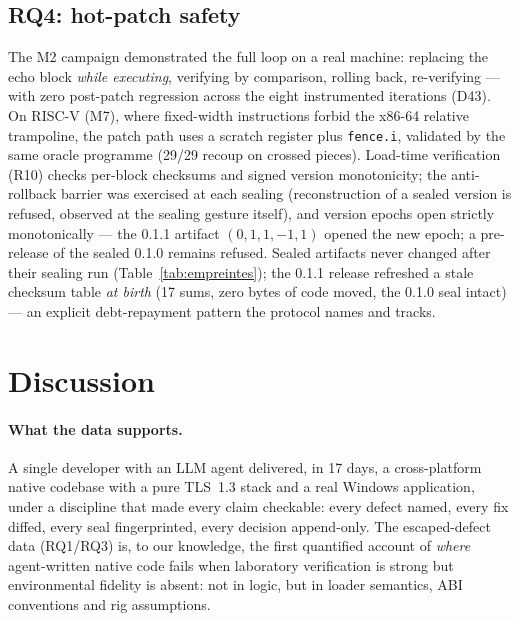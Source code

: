 \documentclass[11pt,a4paper]{article}
\newcommand{\code}[1]{\texttt{\small #1}}
\begin{document}
\subsection{RQ4: hot-patch safety}\label{sec:rq4}

The M2 campaign demonstrated the full loop on a real machine: replacing
the echo block \emph{while executing}, verifying by comparison,
rolling back, re-verifying --- with zero post-patch regression across the
eight instrumented iterations (D43). On RISC-V (M7), where fixed-width
instructions forbid the x86-64 relative trampoline, the patch path uses
a scratch register plus \code{fence.i}, validated by the same oracle
programme (29/29 recoup on crossed pieces). Load-time verification (R10)
checks per-block checksums and signed version monotonicity; the
anti-rollback barrier was exercised at each sealing (reconstruction of a
sealed version is refused, observed at the sealing gesture itself), and
version epochs open strictly monotonically --- the 0.1.1 artifact
$(0,1,1,-1,1)$ opened the new epoch; a pre-release of the sealed 0.1.0
remains refused. Sealed artifacts never changed after their sealing run
(Table~\ref{tab:empreintes}); the 0.1.1 release refreshed a stale
checksum table \emph{at birth} (17 sums, zero bytes of code moved, the
0.1.0 seal intact) --- an explicit debt-repayment pattern the protocol
names and tracks.

\section{Discussion}\label{sec:discussion}

\paragraph{What the data supports.} A single developer with an LLM agent
delivered, in 17 days, a cross-platform native codebase with a pure
TLS~1.3 stack and a real Windows application, under a discipline that
made every claim checkable: every defect named, every fix diffed, every
seal fingerprinted, every decision append-only. The escaped-defect data
(RQ1/RQ3) is, to our knowledge, the first quantified account of
\emph{where} agent-written native code fails when laboratory verification
is strong but environmental fidelity is absent: not in logic, but in
loader semantics, ABI conventions and rig assumptions.
\end{document}
